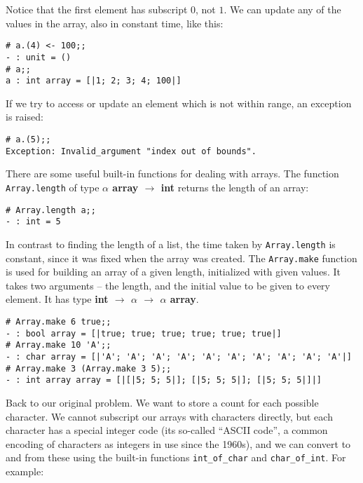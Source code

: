 \documentclass[]{book}
\newcommand{\smspace}{\vspace{4mm}}
\begin{document}
\noindent Notice that the first element has subscript $0$, not $1$. We can update any of the values in the array, also in constant time, like this:

\smspace
\noindent\verb!# a.(4) <- 100;;!\\
\noindent\verb!- : unit = ()!\\
\noindent\verb!# a;;!\\
\noindent\verb!a : int array = [|1; 2; 3; 4; 100|]!
\smspace

\noindent If we try to access or update an element which is not within range, an exception is raised:

\smspace
\noindent\verb!# a.(5);;!\\
\noindent\verb!Exception: Invalid_argument "index out of bounds".!
\smspace

\noindent There are some useful built-in functions for dealing with arrays. The function \texttt{Array.length} of type \textbf{\textsf{$\alpha$ array $\rightarrow$ int}} returns the length of an array:

\smspace
\noindent\verb!# Array.length a;;!\\
\noindent\verb!- : int = 5!
\smspace

\noindent In contrast to finding the length of a list, the time taken by \texttt{Array.length} is constant, since it was fixed when the array was created. The \texttt{Array.make} function is used for building an array of a given length, initialized with given values. It takes two arguments -- the length, and the initial value to be given to every element. It has type \textsf{\textbf{int $\rightarrow$ $\alpha$ $\rightarrow$ $\alpha$ array}}.

\smspace
\noindent\verb!# Array.make 6 true;;!\\
\noindent\verb!- : bool array = [|true; true; true; true; true; true|]!\\
\noindent\verb!# Array.make 10 'A';;!\\
\noindent\verb!- : char array = [|'A'; 'A'; 'A'; 'A'; 'A'; 'A'; 'A'; 'A'; 'A'; 'A'|]!\\
\noindent\verb!# Array.make 3 (Array.make 3 5);;!\\
\noindent\verb!- : int array array = [|[|5; 5; 5|]; [|5; 5; 5|]; [|5; 5; 5|]|]!
\smspace 

\noindent Back to our original problem. We want to store a count for each possible character. We cannot subscript our arrays with characters directly, but each character has a special integer code (its so-called ``ASCII code'', a common encoding of characters as integers in use since the 1960s), and we can convert to and from these using the built-in functions \texttt{int\_of\_char} and \texttt{char\_of\_int}. For example:
\end{document}
